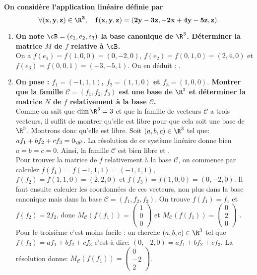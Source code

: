 \documentclass[a4paper, 11pt,reqno]{article}
\begin{document}
\begin{correction}  \;
	\textbf{On consid\`ere l'application lin\'eaire d\'efinie par}
	$$\mathbf{\forall (x,y,z)\in\R^3,\quad f(x,y,z)=(2y-3z, -2x+4y-5z,z).}$$
	\begin{enumerate}
		\item \textbf{On note $\cB=(e_1,e_2,e_3)$ la base canonique de $\R^3$. D\'eterminer la matrice $M$ de $f$ relative \`a $\cB$.}\\
		      On a $f(e_1)=f(1,0,0) = (0,-2,0)$, $f(e_2)=f(0,1,0) = (2,4,0)$ et $f(e_3)=f(0,0,1) = (-3,-5,1)$. On en d\'eduit : .
		\item \textbf{On pose : $f_1=(-1,1,1)$, $f_2=(1,1,0)$ et $f_3=(1,0,0).$ Montrer que la famille $\mathcal{C}=(f_1,f_2,f_3)$ est une base de $\R^3$ et d\'eterminer la matrice $N$ de $f$ relativement \`a la base $\mathcal{C}$.}\\
		      Comme on sait que $\dim \R^3=3$ et que la famille de vecteurs $\mathcal{C}$ a trois vecteurs, il suffit de montrer qu'elle est libre pour que cela soit une base de $\R^3$. Montrons donc qu'elle est libre. Soit $(a,b,c)\in\R^3$ tel que: $af_1+bf_2+cf_3=0_{\R^3}$. La r\'esolution de ce syst\`eme lin\'eaire donne bien $a=b=c=0$. Ainsi, la famille $\mathcal{C}$ est bien libre et .\\
		      Pour trouver la matrice de $f$ relativement \`a la base $\mathcal{C}$, on commence par calculer $f(f_1)=f(-1,1,1)=(-1,1,1)$, $f(f_2)=f(1,1,0)=(2,2,0)$ et $f(f_3)=f(1,0,0) =(0,-2,0)$. Il faut ensuite calculer les coordonn\'ees de ces vecteurs, non plus dans la base canonique mais dans la base $\mathcal{C}=(f_1,f_2,f_3)$. On trouve $f(f_1) = f_1$ et $f(f_2)=2f_2$, donc $M_\mathcal{C}(f(f_1))= \left(\begin{array}{c} 1\\0\\0\end{array}\right)$ et $M_\mathcal{C}(f(f_1))= \left(\begin{array}{c} 0\\2\\0\end{array}\right)$ .\\
		      Pour le troisi\`eme c'est moins facile : on cherche $(a,b,c)\in\R^3$ tel que $f(f_3)=af_1+bf_2+cf_3$ c'est-\`a-dire: $(0,-2,0)=af_1+bf_2+cf_3$.  La r\'esolution donne: $M_\mathcal{C}(f(f_1))= \left(\begin{array}{r} 0\\-2\\2\end{array}\right)$.\\

\end{enumerate}
\end{correction}
\end{document}
